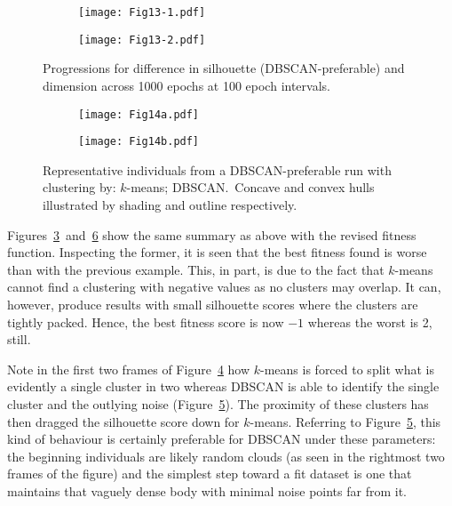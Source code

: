 \begin{figure}[htbp]
    \centering
    \begin{subfigure}{\imgwidth}
        \texttt{[image: Fig13-1.pdf]}
        \caption{}\label{fig:edo:negative:silhouette}
    \end{subfigure}

    \begin{subfigure}{\imgwidth}
        \texttt{[image: Fig13-2.pdf]}
        \caption{}\label{fig:edo:negative:dimension}
    \end{subfigure}
    \caption{%
        Progressions for difference in silhouette (DBSCAN-preferable) and
        dimension across 1000 epochs at 100 epoch intervals.
    }\label{fig:negative-prog}
\end{figure}

\begin{figure}
    \centering
    \begin{subfigure}{\imgwidth}
        \centering
        \texttt{[image: Fig14a.pdf]}
        \caption{}\label{fig:neg-inds-k}
    \end{subfigure}

    \begin{subfigure}{\imgwidth}
        \centering
        \texttt{[image: Fig14b.pdf]}
        \caption{}\label{fig:neg-inds-d}
    \end{subfigure}
    \caption{%
        Representative individuals from a DBSCAN-preferable run with clustering
        by:  \(k\)-means; 
        DBSCAN.\ Concave and convex hulls illustrated by shading and outline
        respectively.
    }\label{fig:negative-inds}
\end{figure}

Figures~\ref{fig:negative-prog}~and~\ref{fig:negative-inds} show the same
summary as above with the revised fitness function. Inspecting the former, it is
seen that the best fitness found is worse than with the previous example. This,
in part, is due to the fact that \(k\)-means cannot find a clustering with
negative values as no clusters may overlap. It can, however, produce results
with small silhouette scores where the clusters are tightly packed. Hence, the
best fitness score is now \(-1\) whereas the worst is 2, still.

Note in the first two frames of Figure~\ref{fig:neg-inds-k} how \(k\)-means is
forced to split what is evidently a single cluster in two whereas DBSCAN is able
to identify the single cluster and the outlying noise
(Figure~\ref{fig:neg-inds-d}). The proximity of these clusters has then dragged
the silhouette score down for \(k\)-means. Referring to
Figure~\ref{fig:neg-inds-d}, this kind of behaviour is certainly preferable for
DBSCAN under these parameters: the beginning individuals are likely random
clouds (as seen in the rightmost two frames of the figure) and the simplest step
toward a fit dataset is one that maintains that vaguely dense body with minimal
noise points far from it.

